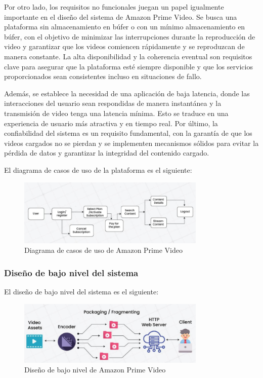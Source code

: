 \documentclass[12pt,a4paper]{article}
\begin{document}
    Por otro lado, los requisitos no funcionales juegan un papel igualmente importante en el diseño del sistema de Amazon Prime Video. Se busca una plataforma sin almacenamiento en búfer o con un mínimo almacenamiento en búfer, con el objetivo de minimizar las interrupciones durante la reproducción de video y garantizar que los videos comiencen rápidamente y se reproduzcan de manera constante. La alta disponibilidad y la coherencia eventual son requisitos clave para asegurar que la plataforma esté siempre disponible y que los servicios proporcionados sean consistentes incluso en situaciones de fallo.

    Además, se establece la necesidad de una aplicación de baja latencia, donde las interacciones del usuario sean respondidas de manera instantánea y la transmisión de video tenga una latencia mínima. Esto se traduce en una experiencia de usuario más atractiva y en tiempo real. Por último, la confiabilidad del sistema es un requisito fundamental, con la garantía de que los videos cargados no se pierdan y se implementen mecanismos sólidos para evitar la pérdida de datos y garantizar la integridad del contenido cargado.

    El diagrama de casos de uso de la plataforma es el siguiente:

    \begin{figure}[H]
        \centering
        \includegraphics[width=0.8\textwidth]{./img/diagrama_casos_amazon.png}
        \caption{Diagrama de casos de uso de Amazon Prime Video}
        \label{fig:amazon_casos}
    \end{figure}

    \subsubsection{Diseño de bajo nivel del sistema}

    El diseño de bajo nivel del sistema es el siguiente:

    \begin{figure}[H]
        \centering
        \includegraphics[width=0.8\textwidth]{./img/bajo_nivel_amazon.png}
        \caption{Diseño de bajo nivel de Amazon Prime Video}
        \label{fig:amazon_bajo_nivel}
    \end{figure}
\end{document}
